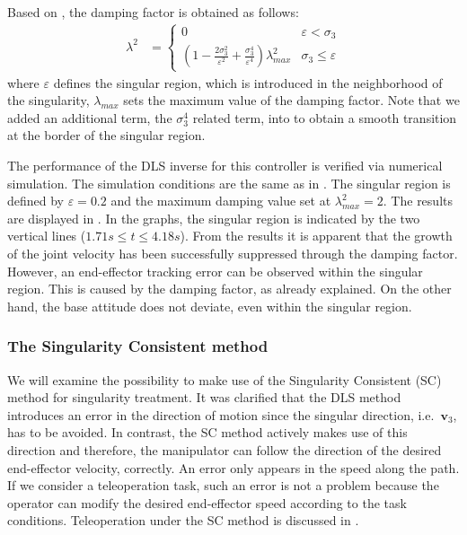 %
Based on \cite{Chiaverini1994},
the damping factor is obtained as follows:
%
\begin{align}
   \lambda^{2} &= \begin{cases} 0 & \varepsilon < \sigma_{3} \\
    (1 - \frac{2\sigma^{2}_{3}}{\varepsilon^{2}} + \frac{\sigma_{3}^{4}}{\varepsilon^{4}})\lambda_{max}^{2}
   & \sigma_{3} \leq \varepsilon\label{eq:damper}
  \end{cases}
\end{align}
%
where  $\varepsilon$ defines the singular region,
which is introduced in the neighborhood of the singularity,
$\lambda_{max}$ sets the maximum value of the damping factor.
Note that we added an additional term, the $\sigma_{3}^{4}$ related term, 
into  to obtain a smooth transition at the border of the singular region.

The performance of the DLS inverse for this controller
is verified via numerical simulation.
The simulation conditions are the same as in .
The singular region is defined by $\varepsilon = 0.2$ and
the maximum damping value set at $\lambda_{max}^{2} = 2$.
The results are displayed in .
In the graphs, the singular region is indicated by the two vertical lines 
($1.71\unit{s} \leq t \leq 4.18\unit{s}$). From the results it is apparent that
the growth of the joint velocity has been successfully suppressed through the damping factor.
However, an end-effector tracking error can be observed within the singular region.
This is caused by the damping factor, as already explained. On the other hand,
the base attitude does not deviate, even within the singular region.


\subsubsection{The Singularity Consistent method}
\label{sec:SIN_SC}
We will examine the possibility to make use of the Singularity Consistent (SC) method
for singularity treatment. It was clarified that the DLS method introduces an error
in the direction of motion since the singular direction, i.e.\ $\bm{v}_{3}$, has to 
be avoided. In contrast,
the SC method actively makes use of this direction and therefore, 
the manipulator can follow the direction of the desired end-effector velocity, correctly.
An error only appears in the speed along the path. If we consider a teleoperation task,
such an error is not a problem because the operator can modify the desired end-effector speed
according to the task conditions. Teleoperation under the SC method is discussed  in 
\cite{Tsumaki1997,Tsumaki1998}.

